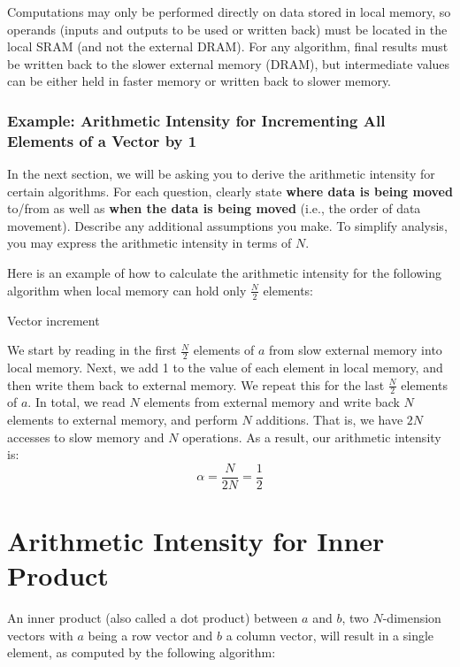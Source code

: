 \documentclass[a4 paper]{article}
\begin{document}
Computations may only be performed directly on data stored in local memory, so operands (inputs and outputs to be used or written back) must be located in the local SRAM (and not the external DRAM).
For any algorithm, final results must be written back to the slower external memory (DRAM), but intermediate values can be either held in faster memory or written back to slower memory.

\subsubsection*{Example: Arithmetic Intensity for Incrementing All Elements of a Vector by 1}
In the next section, we will be asking you to derive the arithmetic intensity for certain algorithms.
For each question, clearly state \textbf{where data is being moved} to/from as well as \textbf{when the data is being moved} (i.e., the order of data movement).
Describe any additional assumptions you make.
To simplify analysis, you may express the arithmetic intensity in terms of $N$.

Here is an example of how to calculate the arithmetic intensity for the following algorithm when local memory can hold only $\frac{N}{2}$ elements:\\
\begin{algorithm}[H]
\SetAlgoLined
\SetInd{0.25em}{0.5em}
\caption{Vector increment}
\label{algo:vector_increment}
\end{algorithm}

We start by reading in the first $\frac{N}{2}$ elements of $a$ from slow external memory into local memory.
Next, we add 1 to the value of each element in local memory, and then write them back to external memory.
We repeat this for the last $\frac{N}{2}$ elements of $a$.
In total, we read $N$ elements from external memory and write back $N$ elements to external memory, and perform $N$ additions.
That is, we have $2N$ accesses to slow memory and $N$ operations.
As a result, our arithmetic intensity is:
\[
\alpha = \frac{N}{2N} = \frac{1}{2}
\]

\noindent

\newpage
\section{Arithmetic Intensity for Inner Product}
\label{sec:ip_ai}
An inner product (also called a dot product) between $a$ and $b$, two $N$-dimension vectors  with $a$ being a row vector and $b$ a column vector, will result in a single element, as computed by the following algorithm:
\end{document}
